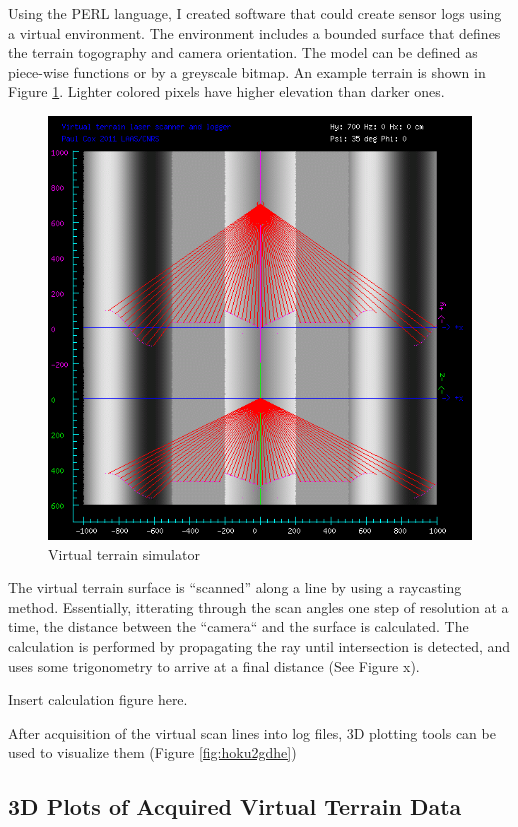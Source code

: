 \documentclass[a4paper,11pt]{report}
\begin{document}
Using the PERL language, I created software that could create sensor logs using a virtual environment. The environment includes a bounded surface that defines the terrain togography and camera orientation. The model can be defined as piece-wise functions or by a greyscale bitmap. An example terrain is shown in Figure \ref{fig:mkvirt}. Lighter colored pixels have higher elevation than darker ones.

\begin{figure}[ht]
 \centering
 \includegraphics[width=12cm]{Mkvirtsample.png}
 \caption{Virtual terrain simulator}
 \label{fig:mkvirt}
\end{figure}

The virtual terrain surface is ``scanned'' along a line by using a raycasting method. Essentially, itterating through the scan angles one step of resolution at a time, the distance between the ``camera`` and the surface is calculated. The calculation is performed by propagating the ray until intersection is detected, and uses some trigonometry to arrive at a final distance (See Figure x).

Insert calculation figure here.

After acquisition of the virtual scan lines into log files, 3D plotting tools can be used to visualize them (Figure \ref{fig:hoku2gdhe})

\subsection{3D Plots of Acquired Virtual Terrain Data}
\end{document}
